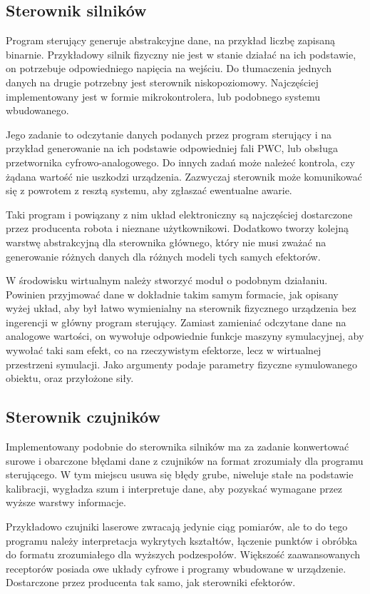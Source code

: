  \subsection{Sterownik silników}
Program sterujący generuje abstrakcyjne dane, na przykład liczbę zapisaną binarnie.
Przykładowy silnik fizyczny nie jest w stanie działać na ich podstawie, on potrzebuje odpowiedniego napięcia na wejściu.
Do tłumaczenia jednych danych na drugie potrzebny jest sterownik niskopoziomowy.
Najczęściej implementowany jest w formie mikrokontrolera, lub podobnego systemu wbudowanego.

Jego zadanie to odczytanie danych podanych przez program sterujący i na przykład generowanie na ich podstawie odpowiedniej fali PWC, lub obsługa przetwornika cyfrowo-analogowego.
Do innych zadań może należeć kontrola, czy żądana wartość nie uszkodzi urządzenia.
Zazwyczaj sterownik może komunikować się z powrotem z resztą systemu, aby zgłaszać ewentualne awarie.

Taki program i powiązany z nim układ elektroniczny są najczęściej dostarczone przez producenta robota i nieznane użytkownikowi.
Dodatkowo tworzy kolejną warstwę abstrakcyjną dla sterownika głównego, który nie musi zważać na generowanie różnych danych dla różnych modeli tych samych efektorów.
 
W środowisku wirtualnym należy stworzyć moduł o podobnym działaniu.
Powinien przyjmować dane w dokładnie takim samym formacie, jak opisany wyżej układ, aby był łatwo wymienialny na sterownik fizycznego urządzenia bez ingerencji w główny program sterujący.
Zamiast zamieniać odczytane dane na analogowe wartości, on wywołuje odpowiednie funkcje maszyny symulacyjnej, aby wywołać taki sam efekt, co na rzeczywistym efektorze, lecz w wirtualnej przestrzeni symulacji.
Jako argumenty podaje parametry fizyczne symulowanego obiektu, oraz przyłożone siły.
 

\subsection{Sterownik czujników}
Implementowany podobnie do sterownika silników ma za zadanie konwertować surowe i obarczone błędami dane z czujników na format zrozumiały dla programu sterującego.
W tym miejscu usuwa się błędy grube, niweluje stałe na podstawie kalibracji, wygładza szum i interpretuje dane, aby pozyskać wymagane przez wyższe warstwy informacje.

Przykładowo czujniki laserowe zwracają jedynie ciąg pomiarów, ale to do tego programu należy interpretacja wykrytych kształtów, łączenie punktów i obróbka do formatu zrozumiałego dla wyższych podzespołów.
Większość zaawansowanych receptorów posiada owe układy cyfrowe i programy wbudowane w urządzenie.
Dostarczone przez producenta tak samo, jak sterowniki efektorów.
 
